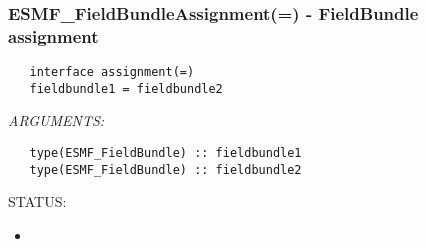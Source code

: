  
\setlength{\oldparskip}{\parskip}
\setlength{\parskip}{1.5ex}
\setlength{\oldparindent}{\parindent}
\setlength{\parindent}{0pt}
\setlength{\oldbaselineskip}{\baselineskip}
\setlength{\baselineskip}{11pt}
 
\def\bv{\begin{verbatim}}
\def\ev{\end{verbatim}}
\def\be{\begin{equation}}
\def\ee{\end{equation}}
\def\bea{\begin{eqnarray}}
\def\eea{\end{eqnarray}}
\def\bi{\begin{itemize}}
\def\ei{\end{itemize}}
\def\bn{\begin{enumerate}}
\def\en{\end{enumerate}}
\def\bd{\begin{description}}
\def\ed{\end{description}}
\def\({\left (}
\def\){\right )}
\def\[{\left [}
\def\]{\right ]}
\def\<{\left  \langle}
\def\>{\right \rangle}
\def\cI{{\cal I}}
\def\diag{\mathop{\rm diag}}
\def\tr{\mathop{\rm tr}}


 
\subsubsection [ESMF\_FieldBundleAssignment(=)] {ESMF\_FieldBundleAssignment(=) - FieldBundle assignment}


  
\begin{verbatim}   interface assignment(=)
   fieldbundle1 = fieldbundle2\end{verbatim}{\em ARGUMENTS:}
\begin{verbatim}   type(ESMF_FieldBundle) :: fieldbundle1
   type(ESMF_FieldBundle) :: fieldbundle2\end{verbatim}
{\sf STATUS:}
   \begin{itemize}
   \item{}
   \end{itemize}
  
